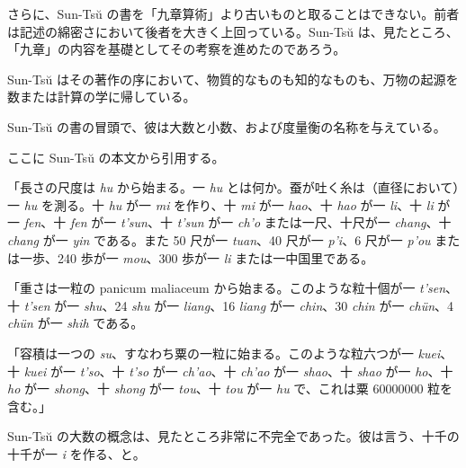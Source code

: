 \documentclass[11pt]{article}
\newcommand{\scanfooter}{}
\begin{document}
さらに、Sun-Tsŭ の書を「九章算術」より古いものと取ることはできない。前者は記述の綿密さにおいて後者を大きく上回っている。Sun-Tsŭ は、見たところ、「九章」の内容を基礎としてその考察を進めたのであろう。

Sun-Tsŭ はその著作の序において、物質的なものも知的なものも、万物の起源を数または計算の学に帰している。

Sun-Tsŭ の書の冒頭で、彼は大数と小数、および度量衡の名称を与えている。

ここに Sun-Tsŭ の本文から引用する。

「長さの尺度は \emph{hu} から始まる。一 \emph{hu} とは何か。蚕が吐く糸は（直径において）一 \emph{hu} を測る。十 \emph{hu} が一 \emph{mi} を作り、十 \emph{mi} が一 \emph{hao}、十 \emph{hao} が一 \emph{li}、十 \emph{li} が一 \emph{fen}、十 \emph{fen} が一 \emph{t'sun}、十 \emph{t'sun} が一 \emph{ch'o} または一尺、十尺が一 \emph{chang}、十 \emph{chang} が一 \emph{yin} である。また 50 尺が一 \emph{tuan}、40 尺が一 \emph{p'i}、6 尺が一 \emph{p'ou} または一歩、240 歩が一 \emph{mou}、300 歩が一 \emph{li} または一中国里である。

「重さは一粒の panicum maliaceum から始まる。このような粒十個が一 \emph{t'sen}、十 \emph{t'sen} が一 \emph{shu}、24 \emph{shu} が一 \emph{liang}、16 \emph{liang} が一 \emph{chin}、30 \emph{chin} が一 \emph{chün}、4 \emph{chün} が一 \emph{shih} である。

「容積は一つの \emph{su}、すなわち粟の一粒に始まる。このような粒六つが一 \emph{kuei}、十 \emph{kuei} が一 \emph{t'so}、十 \emph{t'so} が一 \emph{ch'ao}、十 \emph{ch'ao} が一 \emph{shao}、十 \emph{shao} が一 \emph{ho}、十 \emph{ho} が一 \emph{shong}、十 \emph{shong} が一 \emph{tou}、十 \emph{tou} が一 \emph{hu} で、これは粟 60000000 粒を含む。」

Sun-Tsŭ の大数の概念は、見たところ非常に不完全であった。彼は言う、十千の十千が一 \emph{i} を作る、と。
\scanfooter
\end{document}

